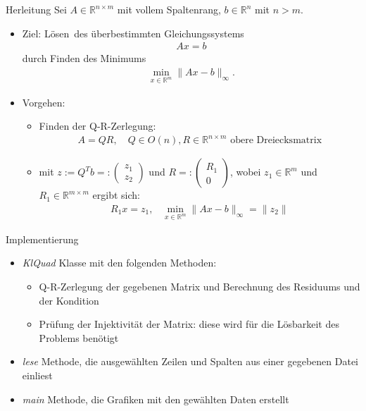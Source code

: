 \documentclass{beamer}
\begin{document}
\begin{frame}{Herleitung}
  Sei $A\in \mathbb{R}^{n\times m}$ mit vollem Spaltenrang,  $b\in \mathbb{R}^n$ mit $n>m$.\\
  \begin{itemize}
  \item Ziel: \glqq Lösen\grqq ~des überbestimmten Gleichungssystems 
  \begin{align}
  Ax=b
  \end{align}
  durch Finden des Minimums
  \begin{align}
  \min\limits_{x\in\mathbb{R}^m}\|Ax-b\|_\infty.
  \end{align}\pause
\item Vorgehen:
\begin{itemize}
\item Finden der Q-R-Zerlegung:
\begin{align}
A=QR, \text{~~~}Q\in  O(n), R\in \mathbb{R}^{n\times m}\text{ obere Dreiecksmatrix}
\end{align}
\item mit $z:=Q^Tb=:
\begin{pmatrix}
z_1\\
\hline
z_2
\end{pmatrix}$ und $R=:\begin{pmatrix}
R_1\\
0
\end{pmatrix}$, wobei $z_1\in\mathbb{R}^{m}$ und $R_1\in\mathbb{R}^{m\times m}$ ergibt sich:
\begin{align}
R_1x=z_1\text{,~~~}  \min\limits_{x\in\mathbb{R}^m}\|Ax-b\|_\infty=\|z_2\|
\end{align}

\end{itemize}
  \end{itemize}
  
\end{frame}

 \begin{frame}{Implementierung}
 	\begin{itemize}
  	\item \textit{KlQuad} Klasse mit den folgenden Methoden:
  	\begin{itemize}
  		\item Q-R-Zerlegung der gegebenen Matrix und Berechnung des Residuums und der Kondition
  		\item Prüfung der Injektivität der Matrix: diese wird für die Lösbarkeit des Problems benötigt  		
  	\end{itemize}
  	\pause
  	\item \textit{lese} Methode, die ausgewählten Zeilen und Spalten aus einer gegebenen Datei einliest
  	\pause
  	\item \textit{main} Methode, die Grafiken mit den gewählten Daten erstellt
  	\end{itemize}
 \end{frame}
\end{document}
